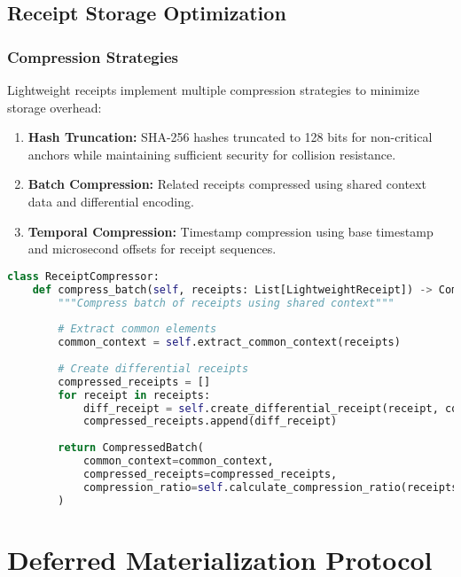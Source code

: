 \documentclass[12pt,a4paper]{article}
\begin{document}
\subsection{Receipt Storage Optimization}

\subsubsection{Compression Strategies}

Lightweight receipts implement multiple compression strategies to minimize storage overhead:

\begin{enumerate}
\item \textbf{Hash Truncation:} SHA-256 hashes truncated to 128 bits for non-critical anchors while maintaining sufficient security for collision resistance.

\item \textbf{Batch Compression:} Related receipts compressed using shared context data and differential encoding.

\item \textbf{Temporal Compression:} Timestamp compression using base timestamp and microsecond offsets for receipt sequences.
\end{enumerate}

\begin{lstlisting}[language=Python, caption=Receipt Compression Implementation]
class ReceiptCompressor:
    def compress_batch(self, receipts: List[LightweightReceipt]) -> CompressedBatch:
        """Compress batch of receipts using shared context"""
        
        # Extract common elements
        common_context = self.extract_common_context(receipts)
        
        # Create differential receipts
        compressed_receipts = []
        for receipt in receipts:
            diff_receipt = self.create_differential_receipt(receipt, common_context)
            compressed_receipts.append(diff_receipt)
        
        return CompressedBatch(
            common_context=common_context,
            compressed_receipts=compressed_receipts,
            compression_ratio=self.calculate_compression_ratio(receipts, compressed_receipts)
        )
\end{lstlisting}

\section{Deferred Materialization Protocol}
\end{document}
